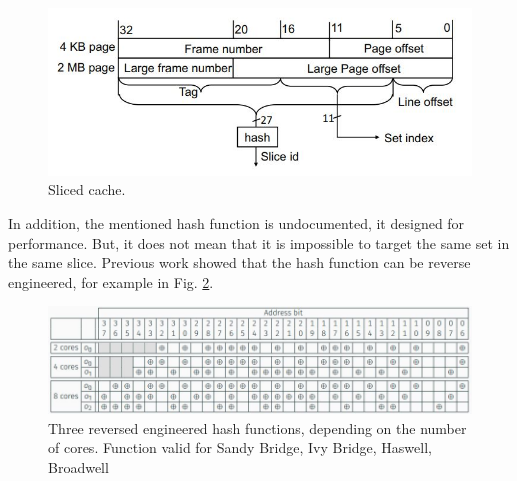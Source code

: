 \begin{figure}[h]
    \centering
    \includegraphics[width=\textwidth]{images/slicedcache.JPG}
    \caption{Sliced cache.}
    \label{fig:slicedcache}
\end{figure}

In addition, the mentioned hash function is undocumented, it designed for performance. But, it does not mean that it is impossible to target the same set in the same slice. Previous work \cite{EURECOM+4671} showed that the hash function can be reverse engineered, for example in Fig. \ref{fig:hashfunc}.

\begin{figure}[h]
    \centering
    \includegraphics[width=\textwidth]{images/hashfunc.JPG}
    \caption{Three reversed engineered hash functions, depending on the number of cores. Function valid for Sandy Bridge, Ivy Bridge, Haswell, Broadwell}
    \label{fig:hashfunc}
\end{figure}

